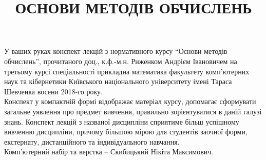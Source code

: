 \documentclass[a5paper, 10pt]{article}
\title{{\Huge ОСНОВИ МЕТОДІВ ОБЧИСЛЕНЬ}}
\date{}
\numberwithin{equation}{subsection}
\numberwithin{equation}{subsection}
\theoremstyle{definition}
\begin{document}
\maketitle \thispagestyle{empty} \newpage 

У ваших руках конспект лекцій з нормативного курсу ``Основи методів обчислень'', прочитаного доц., к.ф.-м.н. Риженком Андрієм Івановичем на третьому курсі спеціальності прикладна математика факультету комп'ютерних наук та кібернетики Київського національного університету імені Тараса Шевченка восени 2018-го року. \\

Конспект у компактній формі відображає матеріал курсу, допомагає сформувати загальне уявлення про предмет вивчення, правильно зорієнтуватися в даній галузі знань. Конспект лекцій з названої дисципліни сприятиме більш успішному вивченню дисципліни, причому більшою мірою для студентів заочної форми, екстернату, дистанційного та індивідуального навчання. \\

Комп'ютерний набір та верстка -- Скибицький Нікіта Максимович. \newpage

\tableofcontents \newpage












\end{document}
